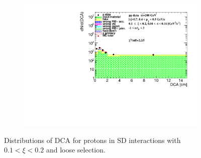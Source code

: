 \begin{figure}[h!]
\begin{subfigure}{.45\textwidth}
		\includegraphics[width=\linewidth, page=14]{chapters/chrgSTAR/img/DCAproton/background_p_2.pdf}
	\end{subfigure}
	\caption{Distributions of DCA for protons in SD interactions with $0.1 < \xi<0.2$ and loose selection.}
	\label{fig:dca_proton_2}
\end{figure}
